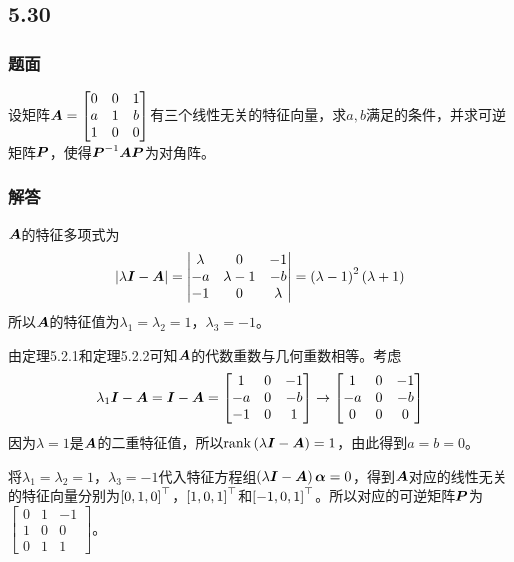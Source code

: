 \documentclass[9pt,xcolor=svgnames]{beamer} %
\begin{document}
\subsection*{5.30}
\begin{frame}
    \frametitle{题面}
    设矩阵\(\boldsymbol{A}=\begin{bmatrix}0&0&1\\a&1&b\\1&0&0\end{bmatrix}\)有三个线性无关的特征向量，求\(a,b\)满足的条件，并求可逆矩阵\(\boldsymbol{P}\)，使得\({\boldsymbol{P}}^{-1}\boldsymbol{A}\boldsymbol{P}\)为对角阵。
\end{frame}

\begin{frame}[allowframebreaks]
    \frametitle{解答}
    \(\boldsymbol{A}\)的特征多项式为
    \begin{equation*}
        \left|\lambda\boldsymbol{I}-\boldsymbol{A} \right|=\begin{vmatrix}\lambda&0&-1\\-a&\lambda-1&-b\\-1&0&\lambda\end{vmatrix}=\left( \lambda-1 \right)^2\left( \lambda+1 \right)
    \end{equation*}
    所以\(\boldsymbol{A}\)的特征值为\(\lambda_1=\lambda_2=1\)，\(\lambda_3=-1\)。

    由定理5.2.1和定理5.2.2可知\(\boldsymbol{A}\)的代数重数与几何重数相等。考虑
    \begin{equation*}
        \lambda_1\boldsymbol{I}-\boldsymbol{A}=\boldsymbol{I}-\boldsymbol{A}=
        \begin{bmatrix}
            1  & 0 & -1 \\
            -a & 0 & -b \\
            -1 & 0 & 1
        \end{bmatrix}\to
        \begin{bmatrix}
            1  & 0 & -1 \\
            -a & 0 & -b \\
            0  & 0 & 0
        \end{bmatrix}
    \end{equation*}
    因为\(\lambda=1\)是\(\boldsymbol{A}\)的二重特征值，所以\(\mathrm{rank}\left( \lambda\boldsymbol{I}-\boldsymbol{A} \right)=1\)，由此得到\(a=b=0\)。

    将\(\lambda_1=\lambda_2=1\)，\(\lambda_3=-1\)代入特征方程组\(\left( \lambda\boldsymbol{I}-\boldsymbol{A} \right)\boldsymbol{\alpha}=0\)，得到\(\boldsymbol{A}\)对应的线性无关的特征向量分别为\(\left[ 0,1,0 \right]^\top\)，\(\left[ 1,0,1 \right]^\top\)和\(\left[ -1,0,1 \right]^\top\)。所以对应的可逆矩阵\(\boldsymbol{P}\)为\(\begin{bmatrix}0&1&-1\\1&0&0\\0&1&1\end{bmatrix}\)。
\end{frame}
\end{document}
